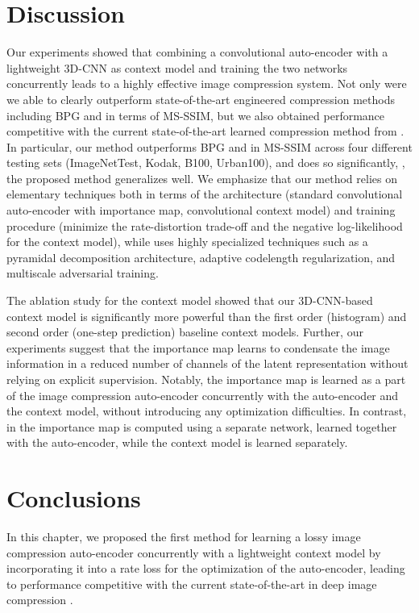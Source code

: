 \section{Discussion}

Our experiments showed that combining a convolutional auto-encoder with a lightweight 3D-CNN as context model and training the two networks concurrently leads to a highly effective image compression system. Not only were we able to clearly outperform state-of-the-art engineered compression methods including BPG and \jpegk in terms of MS-SSIM, but we also obtained performance competitive with the current state-of-the-art learned compression method from \cite{rippel17a}. 
In particular, our method outperforms BPG and \jpegk in MS-SSIM across four different testing sets (ImageNetTest, Kodak, B100, Urban100), and does so significantly, \ie, the proposed method generalizes well. 
We emphasize that our method relies on elementary techniques both in terms of the architecture (standard convolutional auto-encoder with importance map, convolutional context model) and training procedure (minimize the rate-distortion trade-off and the negative log-likelihood for the context model), while \cite{rippel17a} uses highly specialized techniques such as a pyramidal decomposition architecture,
adaptive codelength regularization, and multiscale adversarial training. 

The ablation study for the context model showed that our 3D-CNN-based context model is significantly more powerful than the first order (histogram) and second order (one-step prediction) baseline context models. Further, our experiments suggest that the importance map learns to condensate the image information in a reduced number of channels of the latent representation without relying on explicit supervision. 
Notably, the importance map is learned as a part of the image compression auto-encoder concurrently with the auto-encoder and the context model, without introducing any optimization difficulties. In contrast, in \cite{li2017learning} the importance map is computed using a separate network, learned together with the auto-encoder, while the context model is learned separately.

\section{Conclusions}
\label{imgc:sec:conclusions}
In this chapter, we proposed the first method for learning a lossy image compression auto-encoder concurrently with a lightweight context model by incorporating it into a rate loss for the optimization of the auto-encoder, leading to performance competitive with the current state-of-the-art in deep image compression \cite{rippel17a}.

